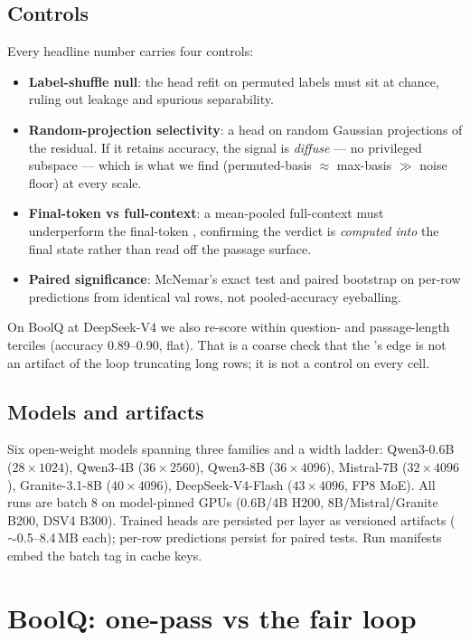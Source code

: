 \subsection{Controls}

Every headline number carries four controls:

\begin{itemize}
\item \textbf{Label-shuffle null}: the head refit on
  permuted labels must sit at chance, ruling out leakage and spurious
  separability.
\item \textbf{Random-projection selectivity}: a head on
  random Gaussian projections of the residual. If it retains accuracy, the
  signal is \emph{diffuse} --- no privileged subspace --- which is what we
  find (permuted-basis $\approx$ max-basis $\gg$ noise floor) at every scale.
\item \textbf{Final-token vs full-context}: a mean-pooled
  full-context \head{} must underperform the final-token \head{}, confirming
  the verdict is \emph{computed into} the final state rather than read off the
  passage surface.
\item \textbf{Paired significance}: McNemar's exact test and paired bootstrap
  on per-row predictions from identical val rows,
  not pooled-accuracy eyeballing.
\end{itemize}

On BoolQ at DeepSeek-V4 we also re-score within question- and passage-length
terciles (accuracy 0.89--0.90, flat). That is a coarse check that the
\head{}'s edge is not an artifact of the loop truncating long rows; it is
not a control on every cell.

\subsection{Models and artifacts}

Six open-weight models spanning three families and a width ladder: Qwen3-0.6B
($28{\times}1024$), Qwen3-4B ($36{\times}2560$), Qwen3-8B ($36{\times}4096$),
Mistral-7B ($32{\times}4096$), Granite-3.1-8B ($40{\times}4096$),
DeepSeek-V4-Flash ($43{\times}4096$, FP8 MoE). All runs are batch 8 on
model-pinned GPUs (0.6B/4B H200, 8B/Mistral/Granite B200, DSV4 B300). Trained
heads are persisted per layer as versioned artifacts ($\sim$0.5--8.4\,MB each);
per-row predictions persist for paired tests. Run manifests embed the batch
tag in cache keys.

\section{BoolQ: one-pass \head{} vs the fair loop}
\label{sec:boolq}

